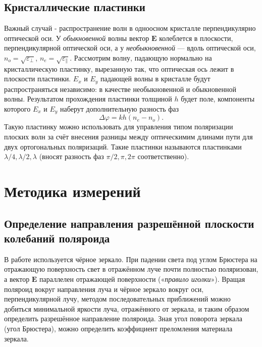 
\subsection*{Кристаллические пластинки}
Важный случай - распространение волн в одноосном кристалле перпендикулярно оптической оси. У \textit{обыкновенной} волны вектор $\bm{E}$ колеблется в плоскости,
перпендикулярной оптической оси, а у \textit{необыкновенной} — вдоль оптической оси, $n_{o} = \sqrt{\varepsilon_{\perp}}$, $n_{e} = \sqrt{\varepsilon_{\parallel}}$.
\n\n
Рассмотрим волну, падающую нормально на
кристаллическую пластинку, вырезанную так, что оптическая ось лежит в плоскости пластинки. $E_x$ и $E_y$ падающей волны в кристалле будут распространяться независимо: в качестве необыкновенной и обыкновенной волны. Результатом прохождения пластинки
толщиной $h$ будет поле, компоненты которого $E_x$ и $E_y$ наберут дополнительную разность фаз
\[\Delta \varphi = kh(n_e - n_o).\]
\n
Такую пластинку можно использовать для управления типом поляризации плоских волн за счёт  внесения разницы между оптическимим длинами пути для двух ортогональных поляризаций. Такие пластинки называются пластинками $\lambda / 4, \lambda / 2, \lambda$ (вносят разность фаз $\pi / 2, \pi, 2\pi$ соответственно).

\section*{Методика измерений}
\subsection*{Определение направления разрешённой плоскости колебаний
поляроида}
В работе используется чёрное зеркало. При падении света под углом Брюстера на отражающую поверхность свет в отражённом луче почти полностью поляризован, а вектор $\bm{E}$
параллелен отражающей поверхности («\textit{правило иголки}»).
\n\n
Вращая поляроид вокруг направления луча и чёрное зеркало вокруг
оси, перпендикулярной лучу, методом последовательных приближений
можно добиться минимальной яркости луча, отражённого от зеркала,
и таким образом определить разрешённое направление поляроида.
\n\n
Зная угол поворота зеркала (угол Брюстера), можно определить  коэффициент преломления материала зеркала.

